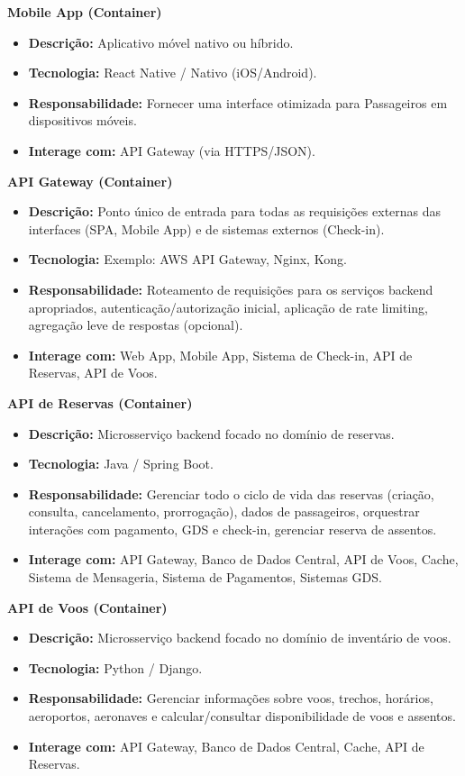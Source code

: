 \textbf{Mobile App (Container)}
\begin{itemize}
    \item \textbf{Descrição:} Aplicativo móvel nativo ou híbrido.
    \item \textbf{Tecnologia:} React Native / Nativo (iOS/Android).
    \item \textbf{Responsabilidade:} Fornecer uma interface otimizada para Passageiros em dispositivos móveis.
    \item \textbf{Interage com:} API Gateway (via HTTPS/JSON).
\end{itemize}

\textbf{API Gateway (Container)}
\begin{itemize}
    \item \textbf{Descrição:} Ponto único de entrada para todas as requisições externas das interfaces (SPA, Mobile App) e de sistemas externos (Check-in).
    \item \textbf{Tecnologia:} Exemplo: AWS API Gateway, Nginx, Kong.
    \item \textbf{Responsabilidade:} Roteamento de requisições para os serviços backend apropriados, autenticação/autorização inicial, aplicação de rate limiting, agregação leve de respostas (opcional).
    \item \textbf{Interage com:} Web App, Mobile App, Sistema de Check-in, API de Reservas, API de Voos.
\end{itemize}

\textbf{API de Reservas (Container)}
\begin{itemize}
    \item \textbf{Descrição:} Microsserviço backend focado no domínio de reservas.
    \item \textbf{Tecnologia:} Java / Spring Boot.
    \item \textbf{Responsabilidade:} Gerenciar todo o ciclo de vida das reservas (criação, consulta, cancelamento, prorrogação), dados de passageiros, orquestrar interações com pagamento, GDS e check-in, gerenciar reserva de assentos.
    \item \textbf{Interage com:} API Gateway, Banco de Dados Central, API de Voos, Cache, Sistema de Mensageria, Sistema de Pagamentos, Sistemas GDS.
\end{itemize}

\textbf{API de Voos (Container)}
\begin{itemize}
    \item \textbf{Descrição:} Microsserviço backend focado no domínio de inventário de voos.
    \item \textbf{Tecnologia:} Python / Django.
    \item \textbf{Responsabilidade:} Gerenciar informações sobre voos, trechos, horários, aeroportos, aeronaves e calcular/consultar disponibilidade de voos e assentos.
    \item \textbf{Interage com:} API Gateway, Banco de Dados Central, Cache, API de Reservas.
\end{itemize}

